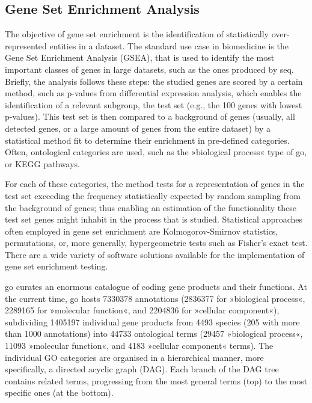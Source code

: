 \begin{method}
\subsection{Gene Set Enrichment Analysis} \label{sec:database:gsea}
The objective of gene set enrichment is the identification of statistically over-represented entities in a dataset. The standard use case in biomedicine is the Gene Set Enrichment Analysis (GSEA), that is used to identify the most important classes of genes in large datasets, such as the ones produced by \ac{seq}. Briefly, the analysis follows these steps: the studied genes are scored by a certain method, such as p-values from differential expression analysis, which enables the identification of a relevant subgroup, the test set (e.g., the 100 genes with lowest p-values). This test set is then compared to a background of genes (usually, all detected genes, or a large amount of genes from the entire dataset) by a statistical method fit to determine their enrichment in pre-defined categories. Often, ontological categories are used, such as the »biological process« type of \ac{go}, or KEGG pathways.

For each of these categories, the method tests for a representation of genes in the test set exceeding the frequency statistically expected by random sampling from the background of genes; thus enabling an estimation of the functionality these test set genes might inhabit in the process that is studied. Statistical approaches often employed in gene set enrichment are Kolmogorov-Smirnov statistics, permutations, or, more generally, hypergeometric tests such as Fisher's exact test. There are a wide variety of software solutions available for the implementation of gene set enrichment testing.

\acl{go} curates an enormous catalogue of coding gene products and their functions. At the current time, \ac{go} hosts \num{7330378} annotations (\num{2836377} for »biological process«, \num{2289165} for »molecular function«, and \num{2204836} for »cellular component«), subdividing \num{1405197} individual gene products from \num{4493} species (\num{205} with more than \num{1000} annotations) into \num{44733} ontological terms (\num{29457} »biological process«, \num{11093} »molecular function«, and \num{4183} »cellular component« terms). The individual GO categories are organised in a hierarchical manner, more specifically, a directed acyclic graph (DAG). Each branch of the DAG tree contains related terms, progressing from the most general terms (top) to the most specific ones (at the bottom). 


\end{method}
